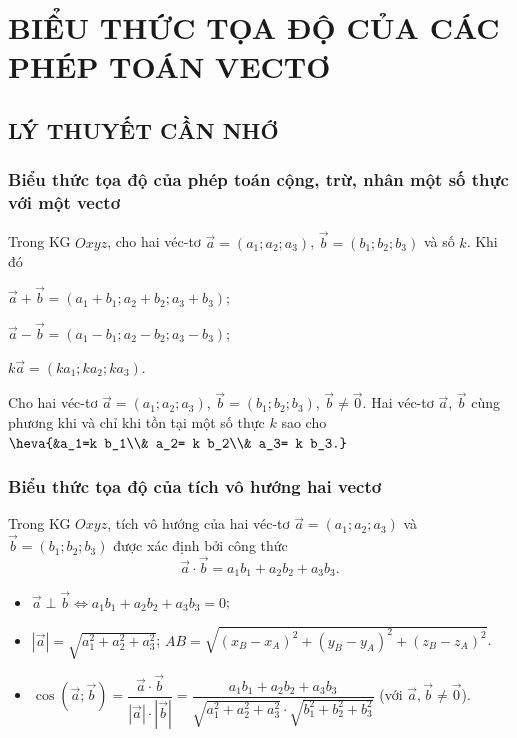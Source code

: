 \setcounter{section}{2}
\setcounter{dang}{0}
\section{BIỂU THỨC TỌA ĐỘ CỦA CÁC PHÉP TOÁN VECTƠ}
\subsection{LÝ THUYẾT CẦN NHỚ}
\subsubsection{Biểu thức tọa độ của phép toán cộng, trừ, nhân một số thực với một vectơ}
Trong KG $Oxyz$, cho hai véc-tơ $\vec{a} = (a_1;a_2;a_3)$, $\vec{b} = (b_1; b_2; b_3)$ và số $k$. Khi đó
\begin{listEX}[1]
	\item [\ding{172}] $\vec{a}+\vec{b}=(a_1+b_1;a_2+b_2;a_3+b_3)$;
	\item [\ding{173}] $\vec{a}-\vec{b}=(a_1-b_1;a_2-b_2;a_3-b_3)$;
	\item [\ding{174}] $k\vec{a} = (ka_1; ka_2; ka_3)$.
\end{listEX}
\begin{note}
	Cho hai véc-tơ $\vec{a}=(a_1;a_2;a_3)$, $\vec{b}=(b_1;b_2;b_3)$, $\vec{b}\ne \vec{0}$. Hai véc-tơ $\vec{a}$, $\vec{b}$ cùng phương khi và chỉ khi tồn tại một số thực $k$ sao cho $\heva{&a_1=k b_1\\& a_2= k b_2\\& a_3= k b_3.}$
\end{note}
\subsubsection{Biểu thức tọa độ của tích vô hướng hai vectơ}
Trong KG $Oxyz$, tích vô hướng của hai véc-tơ $\vec{a} = (a_1;a_2;a_3)$ và $\vec{b} = (b_1; b_2; b_3)$ được xác định bởi công thức
\[\vec{a} \cdot \vec{b} = a_1b_1 + a_2b_2 + a_3b_3. \]
\begin{note}
	\begin{itemize}
		\item[\ding{172}] $\vec{a} \perp \vec{b} \Leftrightarrow a_1b_1 + a_2b_2 + a_3b_3 = 0$;
		\item[\ding{173}] $\left| \vec{a} \right| = \sqrt{a_1^2 + a_2^2 +a_3^2}$; \quad $AB=\sqrt{(x_B-x_A)^2+(y_B-y_A)^2+(z_B-z_A)^2}$.
		\item[\ding{174}] $\cos \left(\vec{a}; \vec{b}\right) = \dfrac{\vec{a}\cdot \vec{b}}{\left|\vec{a}\right| \cdot \left|\vec{b}\right|} = \dfrac{a_1b_1 + a_2b_2 + a_3b_3}{\sqrt{a_1^2 + a_2^2 +a_3^2} \cdot \sqrt{b_1^2 + b_2^2 +b_3^2}}$ (với $\vec{a},\vec{b} \ne \vec{0}$).
	\end{itemize}
\end{note}

